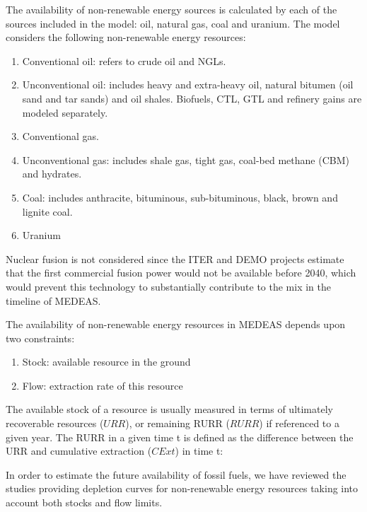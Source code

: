 

The availability of non-renewable energy sources is calculated by each of the sources included in the model: oil, natural gas, coal and uranium.
The model considers the following non-renewable energy resources:

\begin{enumerate}
    \item Conventional oil: refers to crude oil and NGLs.
    \item Unconventional oil: includes heavy and extra-heavy oil, natural bitumen (oil sand and tar
    sands) and oil shales. Biofuels, CTL, GTL and refinery gains are modeled separately.
    \item Conventional gas.
    \item Unconventional gas: includes shale gas, tight gas, coal-bed methane (CBM) and hydrates.
    \item Coal: includes anthracite, bituminous, sub-bituminous, black, brown and lignite coal.
    \item Uranium
\end{enumerate}

Nuclear fusion is not considered since the ITER and DEMO projects
estimate that the first commercial fusion power would not be available before 2040, which would prevent this technology to substantially contribute to the mix
in the timeline of MEDEAS.

The availability of non-renewable energy resources in MEDEAS depends upon two constraints:

\begin{enumerate}
    \item Stock: available resource in the ground
    \item Flow: extraction rate of this resource
\end{enumerate}

The available stock of a resource is usually measured in terms of ultimately recoverable resources
($URR$), or remaining RURR ($RURR$) if referenced to a given year. The RURR in a given time t is defined
as the difference between the URR and cumulative extraction ($CExt$) in time t:

In order to estimate the future availability of fossil fuels, we have reviewed the studies providing
depletion curves for non-renewable energy resources taking into account both stocks and flow
limits. 

